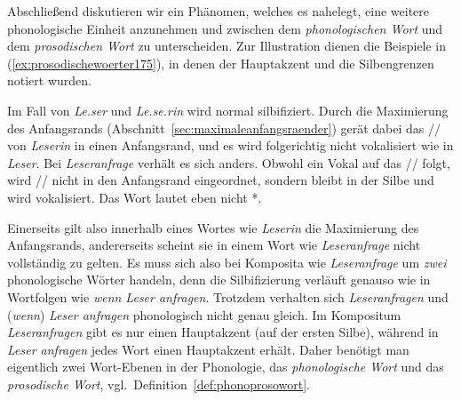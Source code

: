 Abschließend diskutieren wir ein Phänomen, welches es nahelegt, eine weitere phonologische Einheit anzunehmen und zwischen dem \textit{phonologischen Wort} und dem \textit{prosodischen Wort} zu unterscheiden.
Zur Illustration dienen die Beispiele in (\ref{ex:prosodischewoerter175}), in denen der Hauptakzent und die Silbengrenzen notiert wurden.

\begin{exe}
  \ex\label{ex:prosodischewoerter175}
  \begin{xlist}
  \end{xlist}
\end{exe}

Im Fall von \textit{Le.ser} und \textit{Le.se.rin} wird normal silbifiziert.
Durch die Maximierung des Anfangsrands (Abschnitt~\ref{sec:maximaleanfangsraender}) gerät dabei das // von \textit{Leserin} in einen Anfangsrand, und es wird folgerichtig nicht vokalisiert wie in \textit{Leser}.
Bei \textit{Leseranfrage} verhält es sich anders.
Obwohl ein Vokal auf das // folgt, wird // nicht in den Anfangsrand eingeordnet, sondern bleibt in der Silbe \textipa{[z5]} und wird vokalisiert.
Das Wort lautet eben nicht *.

Einerseits gilt also innerhalb eines Wortes wie \textit{Leserin} die Maximierung des Anfangsrands, andererseits scheint sie in einem Wort wie \textit{Leseranfrage} nicht vollständig zu gelten.
Es muss sich also bei Komposita wie \textit{Leseranfrage} um \textit{zwei} phonologische Wörter handeln, denn die Silbifizierung verläuft genauso wie in Wortfolgen wie \textit{wenn Leser anfragen}.
Trotzdem verhalten sich \textit{Leseranfragen} und (\textit{wenn}) \textit{Leser anfragen} phonologisch nicht genau gleich.
Im Kompositum \textit{Leseranfragen} gibt es nur einen Hauptakzent (auf der ersten Silbe), während in \textit{Leser anfragen} jedes Wort einen Hauptakzent erhält.
Daher benötigt man eigentlich zwei Wort-Ebenen in der Phonologie, das \textit{phonologische Wort} und das \textit{prosodische Wort}, vgl.\ Definition~\ref{def:phonoprosowort}.


